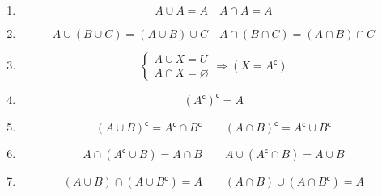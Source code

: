 \documentclass[a4paper, 12pt, oneside, titlepage, BCOR=1mm, DIV=12]{scrreprt}
\newcommand{\compl}{^\mathsf{c}}
\let\emptyset\varnothing
\let\emptyset\varnothing
\newcommand{\compl}{^\mathsf{c}}
\begin{document}
\begin{enumerate}
    \item \normalsize{}

      \begin{displaymath}
        A\cup{A} = A \quad A\cap{A} = A
      \end{displaymath}

    \item \normalsize{}

      \begin{displaymath}
        A\cup{(B\cup{C})}=(A\cup{B})\cup{C} \quad A\cap{(B\cap{C})} = (A\cap{B})\cap{C}
      \end{displaymath}

    \item \normalsize{}
      \begin{displaymath}
        \left\{\begin{array}{l}
            A \cup{X} = U \\
            A \cap{X} = \emptyset
            \end{array} \Rightarrow (X = A\compl)
      \end{displaymath}

    \item \normalsize{}
      \begin{displaymath}
        (A\compl)\compl = A
      \end{displaymath}

    \item \normalsize{}
      \begin{displaymath}
        (A\cup{B})\compl = A\compl\cap{B\compl} \qquad (A\cap{B})\compl = A\compl\cup{B\compl}
      \end{displaymath}

    \item \normalsize{}
      \begin{displaymath}
        A\cap{(A\compl\cup{B})}=A\cap{B} \qquad A\cup{(A\compl\cap{B})}=A\cup{B}
      \end{displaymath}

    \item \normalsize{}
      \begin{displaymath}
        (A\cup{B})\cap{(A\cup{B\compl})} = A \qquad    (A\cap{B})\cup{(A\cap{B\compl})} = A
      \end{displaymath}

  \end{enumerate}
\end{document}
